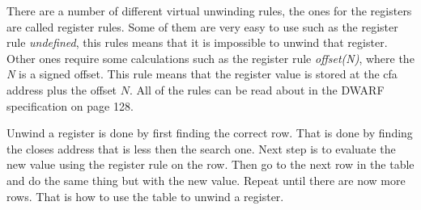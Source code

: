 There are a number of different virtual unwinding rules, the ones for the registers are called register rules.
Some of them are very easy to use such as the register rule \emph{undefined}, this rules means that it is impossible to unwind that register.
Other ones require some calculations such as the register rule \emph{offset(N)}, where the \emph{N} is a signed offset.
This rule means that the register value is stored at the \gls{cfa} address plus the offset $N$.
All of the rules can be read about in the \gls{DWARF} specification \cite{dwarf} on page 128.


Unwind a register is done by first finding the correct row.
That is done by finding the closes address that is less then the search one.
Next step is to evaluate the new value using the register rule on the row.
Then go to the next row in the table and do the same thing but with the new value.
Repeat until there are now more rows.
That is how to use the table to unwind a register.

